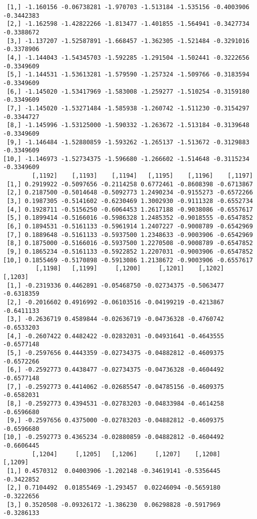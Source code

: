 \documentclass[
  letterpaper,
  DIV=11,
  numbers=noendperiod]{scrreprt}
\begin{document}
\begin{verbatim}
 [1,] -1.160156 -0.06738281 -1.970703 -1.513184 -1.535156 -0.4003906 -0.3442383
 [2,] -1.162598 -1.42822266 -1.813477 -1.401855 -1.564941 -0.3427734 -0.3388672
 [3,] -1.137207 -1.52587891 -1.668457 -1.362305 -1.521484 -0.3291016 -0.3378906
 [4,] -1.144043 -1.54345703 -1.592285 -1.291504 -1.502441 -0.3222656 -0.3349609
 [5,] -1.144531 -1.53613281 -1.579590 -1.257324 -1.509766 -0.3183594 -0.3349609
 [6,] -1.145020 -1.53417969 -1.583008 -1.259277 -1.510254 -0.3159180 -0.3349609
 [7,] -1.145020 -1.53271484 -1.585938 -1.260742 -1.511230 -0.3154297 -0.3344727
 [8,] -1.145996 -1.53125000 -1.590332 -1.263672 -1.513184 -0.3139648 -0.3349609
 [9,] -1.146484 -1.52880859 -1.593262 -1.265137 -1.513672 -0.3129883 -0.3349609
[10,] -1.146973 -1.52734375 -1.596680 -1.266602 -1.514648 -0.3115234 -0.3349609
        [,1192]    [,1193]    [,1194]   [,1195]    [,1196]    [,1197]
 [1,] 0.2919922 -0.5097656 -0.2114258 0.6772461 -0.8608398 -0.6713867
 [2,] 0.2187500 -0.5014648 -0.5092773 1.2490234 -0.9155273 -0.6572266
 [3,] 0.1987305 -0.5141602 -0.6230469 1.3002930 -0.9111328 -0.6552734
 [4,] 0.1928711 -0.5156250 -0.6064453 1.2617188 -0.9038086 -0.6557617
 [5,] 0.1899414 -0.5166016 -0.5986328 1.2485352 -0.9018555 -0.6547852
 [6,] 0.1894531 -0.5161133 -0.5961914 1.2407227 -0.9008789 -0.6542969
 [7,] 0.1889648 -0.5161133 -0.5937500 1.2348633 -0.9003906 -0.6542969
 [8,] 0.1875000 -0.5166016 -0.5937500 1.2270508 -0.9008789 -0.6547852
 [9,] 0.1865234 -0.5161133 -0.5922852 1.2207031 -0.9003906 -0.6547852
[10,] 0.1855469 -0.5170898 -0.5913086 1.2138672 -0.9003906 -0.6557617
         [,1198]   [,1199]     [,1200]     [,1201]    [,1202]    [,1203]
 [1,] -0.2319336 0.4462891 -0.05468750 -0.02734375 -0.5063477 -0.6318359
 [2,] -0.2016602 0.4916992 -0.06103516 -0.04199219 -0.4213867 -0.6411133
 [3,] -0.2636719 0.4589844 -0.02636719 -0.04736328 -0.4760742 -0.6533203
 [4,] -0.2607422 0.4482422 -0.02832031 -0.04931641 -0.4643555 -0.6577148
 [5,] -0.2597656 0.4443359 -0.02734375 -0.04882812 -0.4609375 -0.6572266
 [6,] -0.2592773 0.4438477 -0.02734375 -0.04736328 -0.4604492 -0.6577148
 [7,] -0.2592773 0.4414062 -0.02685547 -0.04785156 -0.4609375 -0.6582031
 [8,] -0.2592773 0.4394531 -0.02783203 -0.04833984 -0.4614258 -0.6596680
 [9,] -0.2597656 0.4375000 -0.02783203 -0.04882812 -0.4609375 -0.6596680
[10,] -0.2592773 0.4365234 -0.02880859 -0.04882812 -0.4604492 -0.6606445
        [,1204]     [,1205]   [,1206]     [,1207]    [,1208]    [,1209]
 [1,] 0.4570312  0.04003906 -1.202148 -0.34619141 -0.5356445 -0.3422852
 [2,] 0.7104492  0.01855469 -1.293457  0.02246094 -0.5659180 -0.3222656
 [3,] 0.3520508 -0.09326172 -1.386230  0.06298828 -0.5917969 -0.3286133

\end{verbatim}
\end{document}
